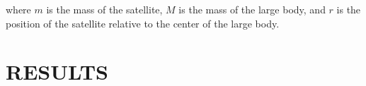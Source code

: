 \documentclass[twocolumn,prl,nobalancelastpage,aps,10pt]{revtex4-1}
\begin{document}
where $m$ is the mass of the satellite, $M$ is the mass of the large body, and $r$ is the position of the satellite relative to the center of the large body.
%
%
%
%

%

\section{RESULTS}
\end{document}
